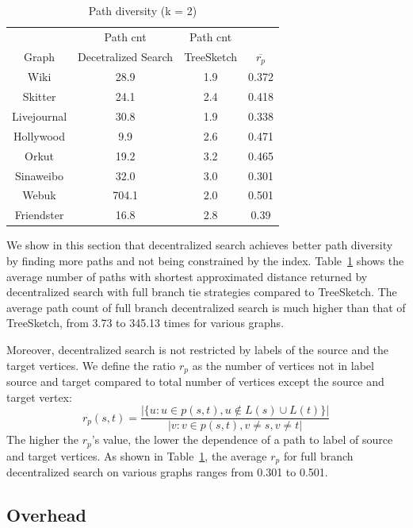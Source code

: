 \begin{table}
	\caption{Path diversity (k = 2)}
	\vspace{2 mm}
  \label{table:pdiv}
  \centering
  \begin{tabular}{c|ccc} \hline
		&Path cnt&Path cnt& \\
		Graph&Decetralized Search&TreeSketch&$\overline{r_p}$ \\ \hline
		Wiki&28.9&1.9&0.372 \\ 
		Skitter&24.1&2.4&0.418 \\ 
		Livejournal&30.8&1.9&0.338 \\ 
		Hollywood&9.9&2.6&0.471 \\ 
		Orkut&19.2&3.2&0.465 \\ 
		Sinaweibo&32.0&3.0&0.301 \\ 
		Webuk&704.1&2.0&0.501 \\ 
		Friendster&16.8&2.8&0.39 \\ \hline
  \end{tabular}
\end{table}

We show in this section that decentralized search achieves better path diversity by finding more paths and not being constrained by the index. Table~\ref{table:pdiv} shows the average number of paths with shortest approximated distance returned by decentralized search with full branch tie strategies compared to TreeSketch. The average path count of full branch decentralized search is much higher than that of TreeSketch, from 3.73 to 345.13 times for various graphs.

Moreover, decentralized search is not restricted by labels of the source and the target vertices. We define the ratio $r_p$ as the number of vertices not in label source and target compared to total number of vertices except the source and target vertex:
\[
r_p(s,t) = \frac{|\{u:u \in p(s,t), u \notin L(s) \cup L(t)\}|}{|{v:v \in p(s,t), v \neq s, v \neq t}|}
\]
The higher the $r_p$'s value, the lower the dependence of a path to label of source and target vertices. As shown in Table~\ref{table:pdiv}, the average $r_p$ for full branch decentralized search on various graphs ranges from 0.301 to 0.501.

\subsection{Overhead}
\label{eval_overhead}

